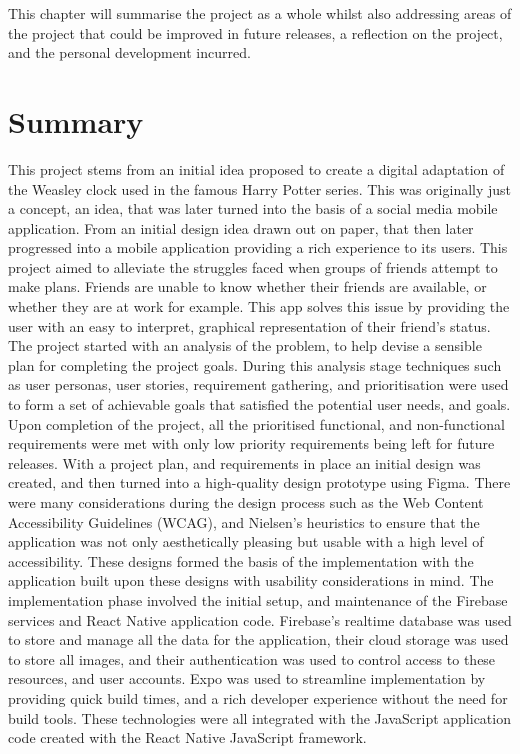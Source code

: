 This chapter will summarise the project as a whole whilst also addressing areas of the project that could be improved in future releases, a reflection on the project, and the personal development incurred.

\section{Summary}
This project stems from an initial idea proposed to create a digital adaptation of the Weasley clock used in the famous Harry Potter series. This was originally just a concept, an idea, that was later turned into the basis of a social media mobile application. From an initial design idea drawn out on paper, that then later progressed into a mobile application providing a rich experience to its users. This project aimed to alleviate the struggles faced when groups of friends attempt to make plans. Friends are unable to know whether their friends are available, or whether they are at work for example. This app solves this issue by providing the user with an easy to interpret, graphical representation of their friend's status.\newline\newline
The project started with an analysis of the problem, to help devise a sensible plan for completing the project goals. During this analysis stage techniques such as user personas, user stories, requirement gathering, and prioritisation were used to form a set of achievable goals that satisfied the potential user needs, and goals. Upon completion of the project, all the prioritised functional, and non-functional requirements were met with only low priority requirements being left for future releases. \newline\newline  
With a project plan, and requirements in place an initial design was created, and then turned into a high-quality design prototype using Figma. There were many considerations during the design process such as the Web Content Accessibility Guidelines (WCAG), and Nielsen's heuristics to ensure that the application was not only aesthetically pleasing but usable with a high level of accessibility.\newline\newline
These designs formed the basis of the implementation with the application built upon these designs with usability considerations in mind. The implementation phase involved the initial setup, and maintenance of the Firebase services and React Native application code. Firebase's realtime database was used to store and manage all the data for the application, their cloud storage was used to store all images, and their authentication was used to control access to these resources, and user accounts. Expo was used to streamline implementation by providing quick build times, and a rich developer experience without the need for build tools. These technologies were all integrated with the JavaScript application code created with the React Native JavaScript framework. \newline\newline
